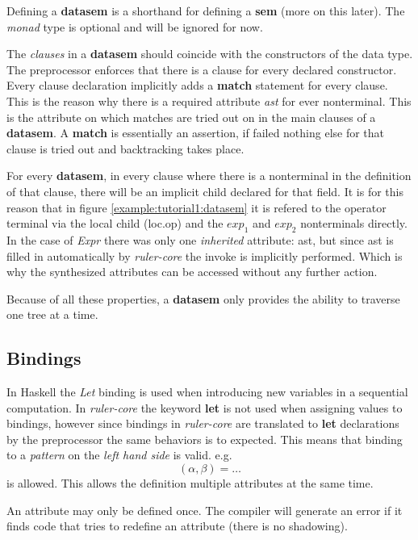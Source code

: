 \documentclass[twoside, titlepage, openright, a4paper]{book}
\newcommand{\rcore}{\emph{ruler-core }}
\begin{document}
Defining a \textbf{datasem} is a shorthand for defining a \textbf{sem} (more on this later). The \emph{monad} type is optional and will be ignored for now. %

The \emph{clauses} in a \textbf{datasem} should coincide with the constructors of the data type. The preprocessor enforces that there is a clause for every declared constructor. Every clause declaration implicitly adds a \textbf{match} statement for every clause. This is the reason why there is a required attribute \emph{ast} for ever nonterminal. This is the attribute on which matches are tried out on in the main clauses of a \textbf{datasem}. A \textbf{match} is essentially an assertion, if failed nothing else for that clause is tried out and backtracking takes place.

For every \textbf{datasem}, in every clause where there is a nonterminal in the definition of that clause, there will be an implicit child declared for that field. It is for this reason that in figure \ref{example:tutorial1:datasem} it is refered to the operator terminal via the local child (loc.op) and the \emph{\ensuremath{exp_1}} and \emph{\ensuremath{exp_2}} nonterminals directly. In the case of \emph{Expr} there was only one \emph{inherited} attribute: ast, but since ast is filled in automatically by \rcore the invoke is implicitly performed. Which is why the synthesized attributes can be accessed without any further action. 

Because of all these properties, a \textbf{datasem} only provides the ability to traverse one tree at a time.
\subsection{Bindings}
\label{bindings}
In Haskell the \emph{Let} binding is used when introducing new variables in a sequential computation. In \rcore the keyword \textbf{let} is not used when assigning values to bindings, however since bindings in \rcore are translated to \textbf{let} declarations by the preprocessor the same behaviors is to expected. This means that binding to a \emph{pattern} on the \emph{left hand side} is valid. e.g. \[ (\alpha, \beta) = \ldots \] is allowed. This allows the definition multiple attributes at the same time.

An attribute may only be defined once. The compiler will generate an error if it finds code that tries to redefine an attribute (there is no shadowing).
\end{document}
